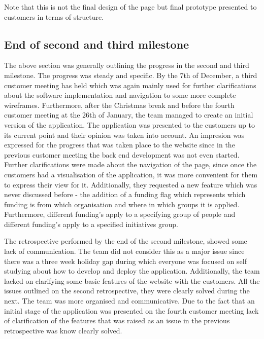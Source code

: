 \documentclass{l3proj}
\begin{document}
Note that this is not the final design of the page but final prototype presented to customers in terms of structure.


\subsection{End of second and third milestone}
\label{sec:milestone23}

The above section was generally outlining the progress in the second and third milestone. The progress was steady and specific. By the 7th of December, a third customer meeting has held which was again mainly used for further clarifications about the software implementation and navigation to some more complete wireframes. Furthermore, after the Christmas break and before the fourth customer meeting at the 26th of January, the team managed to create an initial version of the application. The application was presented to the customers up to its current point and their opinion was taken into account. An impresion was expressed for the progress that was taken place to the website since in the previous customer meeting the back end development was not even started. Further clarifications were made about the navigation of the page, since once the customers had a visualisation of the application, it was more convenient for them to express their view for it. Additionally, they requested a new feature which was never discussed before - the addition of a funding flag which represents which funding is from which organisation and where in which groups it is applied. Furthermore, different funding's apply to a specifying group of people and different funding's apply to a specified initiatives group.

The retrospective performed by the end of the second milestone, showed some lack of communication. The team did not consider this as a major issue since there was a three week holiday gap during which everyone was focused on self studying about how to develop and deploy the application. Additionally, the team lacked on clarifying some basic features of the website with the customers. All the issues outlined on the second retrospective, they were clearly solved during the next. The team was more organised and communicative. Due to the fact that an initial stage of the application was presented on the fourth customer meeting lack of clarification of the features that was raised as an issue in the previous retrospective was know clearly solved.

\end{document}
